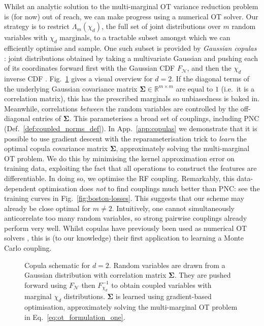 Whilst an analytic solution to the multi-marginal OT variance reduction problem is (for now) out of reach, we can make progress using a numerical OT solver. 
Our strategy is to restrict $\Lambda_m(\chi_d)$, the full set of joint distributions over $m$ random variables with $\chi_d$ marginals, to a tractable subset amongst which we can efficiently optimise and sample. 
One such subset is provided by \emph{Gaussian copulas} \citep{nelsen2006introduction,haugh2016introduction}: joint distributions obtained by taking a multivariate Gaussian and pushing each of its coordinates forward first with the Gaussian CDF $F_\mathcal{N}$, and then the $\chi_d$ inverse CDF .
Fig.~\ref{fig:copula_schematic_main} gives a visual overview for $d=2$.
If the diagonal terms of the underlying Gaussian covariance matrix $\mathbf{\Sigma}\in \mathbb{R}^{m \times m}$ are equal to $1$ (i.e.~it is a correlation matrix), this has the prescribed marginals so unbiasedness is baked in.
Meanwhile, correlations \emph{between} the random variables are controlled by the off-diagonal entries of $\mathbf{\Sigma}$.
This parameterises a broad set of couplings, including PNC (Def.~\ref{def:coupled_norms_def}). 
In App.~\ref{app:copulas} we demonstrate that it is possible to use gradient descent with the reparameterisation trick to \emph{learn} the optimal copula covariance matrix $\mathbf{\Sigma}$, approximately solving the multi-marginal OT problem.
We do this by minimising the kernel approximation error on training data, exploiting the fact that all operations to construct the features are differentiable. 
In doing so, we optimise the RF coupling.
Remarkably, this data-dependent optimisation does \emph{not} to find couplings much better than PNC: see the training curves in Fig.~\ref{fig:boston-losses}.
This suggests that our scheme may already be close optimal for $m \neq 2$. 
Intuitively, one cannot simultaneously anticorrelate too many random variables, so strong pairwise couplings already perform very well.
Whilst copulas have previously been used as numerical OT solvers \citep{chi2019approximate}, this is (to our knowledge) their first application to learning a Monte Carlo coupling.

\begin{figure}
\centering \hspace{-2mm}
    
\caption{Copula schematic for $d=2$.
Random variables are drawn from a Gaussian distribution with correlation matrix $\mathbf{\Sigma}$.
They are pushed forward using $F_\mathcal{N}$ then $F_{\chi_d}^{-1}$ to obtain coupled variables with marginal $\chi_d$ distributions.
$\mathbf{\Sigma}$ is learned using gradient-based optimisation, approximately solving the multi-marginal OT problem in Eq.~\ref{eq:ot_formulation_one}.
}\label{fig:copula_schematic_main} 
\end{figure}

